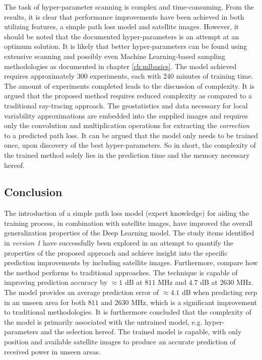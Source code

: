 The task of hyper-parameter scanning is complex and time-consuming. From the results, it is clear that performance improvements have been achieved in both utilizing features, a simple path loss model and satellite images. However, it should be noted that the documented hyper-parameters is an attempt at an optimum solution. It is likely that better hyper-parameters can be found using extensive scanning and possibly even Machine Learning-based sampling methodologies as documented in chapter \ref{ch:mlbasics}. The model achieved requires approximately 300 experiments, each with 240 minutes of training time. The amount of experiments completed leads to the discussion of complexity. It is argued that the proposed method requires reduced complexity as compared to a traditional ray-tracing approach. The geostatistics and data necessary for local variability approximations are embedded into the supplied images and requires only the convolution and multiplication operations for extracting the \emph{correction} to a predicted path loss. It can be argued that the model only needs to be trained once, upon discovery of the best hyper-parameters. So in short, the complexity of the trained method solely lies in the prediction time and the memory necessary hereof. 

\subsection{Conclusion}\label{subsec:conclusion_v2}
The introduction of a simple path loss model (expert knowledge) for aiding the training process, in combination with satellite images, have improved the overall generalization properties of the Deep Learning model. The study items identified in \emph{version 1} have successfully been explored in an attempt to quantify the properties of the proposed approach and achieve insight into the specific prediction improvements by including satellite images. Furthermore, compare how the method performs to traditional approaches. The technique is capable of improving prediction accuracy by $\approx 1$ dB at $811$ MHz and $4.7$ dB at $2630$ MHz. The model provides an average prediction error of $\approx 4.1$ dB when predicting \gls{rsrp} in an unseen area for both $811$ and $2630$ MHz, which is a significant improvement to traditional methodologies. It is furthermore concluded that the complexity of the model is primarily associated with the untrained model, e.g. hyper-parameters and the selection hereof. The trained model is capable, with only position and available satellite images to produce an accurate prediction of received power in unseen areas.
